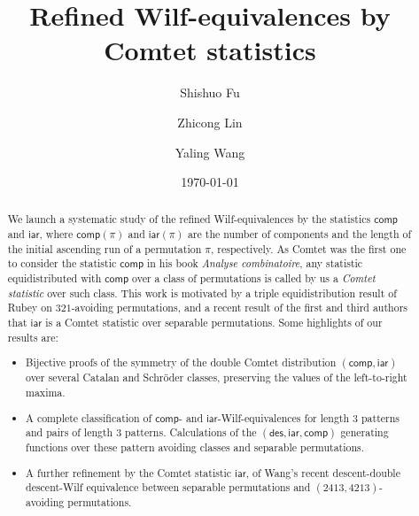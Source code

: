 \documentclass[12pt]{amsart}
\numberwithin{equation}{section}
\theoremstyle{plain}
\theoremstyle{definition}
\def\des{\mathsf{des}}
\def\iar{\mathsf{iar}}
\def\comp{\mathsf{comp}}
\begin{document}
\title[Refined Wilf-equivalences]{Refined Wilf-equivalences by Comtet statistics}


\author[S. Fu]{Shishuo Fu}
\address[Shishuo Fu]{College of Mathematics and Statistics, Chongqing University, Huxi campus, Chongqing 401331, P.R. China}

\author[Z. Lin]{Zhicong Lin}
\address[Zhicong Lin]{Research Center for Mathematics and Interdisciplinary Sciences, Shandong University, Qingdao 266237, P.R. China}

\author[Y. Wang]{Yaling Wang}
\address[Yaling Wang]{College of Mathematics and Statistics, Chongqing University, Huxi campus, Chongqing 401331, P.R. China}

\date{\today}


\begin{abstract}
We launch a systematic study of the refined Wilf-equivalences by the statistics $\comp$ and $\iar$, where  $\comp(\pi)$ and $\iar(\pi)$ are  the number of components and the length of the initial ascending run of a permutation $\pi$, respectively. As Comtet was the first one to consider the statistic $\comp$ in his book {\em Analyse combinatoire},  any statistic equidistributed with $\comp$ over a class of permutations is called by us a {\em Comtet statistic} over such class. This work is motivated by a triple equidistribution result of Rubey on $321$-avoiding permutations, and a recent result of the first and third authors that $\iar$ is a Comtet statistic over separable permutations. Some highlights of our results are: 
\begin{itemize}
	\item Bijective proofs of the symmetry of the double Comtet distribution $(\comp,\iar)$ over several Catalan and Schr\"oder classes, preserving the values of the left-to-right maxima.
	\item A complete classification of $\comp$- and $\iar$-Wilf-equivalences for length $3$ patterns and pairs of length $3$ patterns. Calculations of the $(\des,\iar,\comp)$ generating functions over these pattern avoiding classes and separable permutations.
	\item A further refinement by the Comtet statistic $\iar$, of Wang's recent descent-double descent-Wilf equivalence between separable permutations and $(2413,4213)$-avoiding permutations.
\end{itemize}
\end{abstract}
\end{document}
